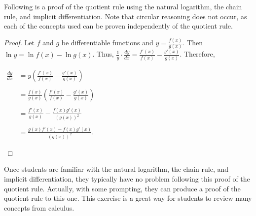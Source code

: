 \documentclass[12pt]{article}
\begin{document}
Following is a proof of the quotient rule using the natural logarithm, the chain rule, and implicit differentiation.  Note that circular reasoning does not occur, as each of the concepts used can be proven independently of the quotient rule.

\begin{proof}
Let $f$ and $g$ be differentiable functions and $\displaystyle y=\frac{f(x)}{g(x)}$.  Then $\ln y=\ln f(x)-\ln g(x)$.  Thus, $\displaystyle \frac{1}{y} \cdot \frac{dy}{dx}=\frac{f'(x)}{f(x)}-\frac{g'(x)}{g(x)}$.  Therefore,

\begin{center}
$\begin{array}{rl}
\displaystyle \frac{dy}{dx} & \displaystyle = y \left( \frac{f'(x)}{f(x)}-\frac{g'(x)}{g(x)} \right) \\
& \\
& \displaystyle = \frac{f(x)}{g(x)} \left( \frac{f'(x)}{f(x)}-\frac{g'(x)}{g(x)} \right) \\
& \\
& \displaystyle = \frac{f'(x)}{g(x)}-\frac{f(x)g'(x)}{(g(x))^2} \\
& \\
& \displaystyle = \frac{g(x)f'(x)-f(x)g'(x)}{(g(x))^2}. \end{array}$
\end{center}
\end{proof}

Once students are familiar with the natural logarithm, the chain rule, and implicit differentiation, they typically have no problem following this proof of the quotient rule.  Actually, with some prompting, they can produce a proof of the quotient rule  to this one.  This exercise is a great way for students to review many concepts from calculus.
\end{document}
